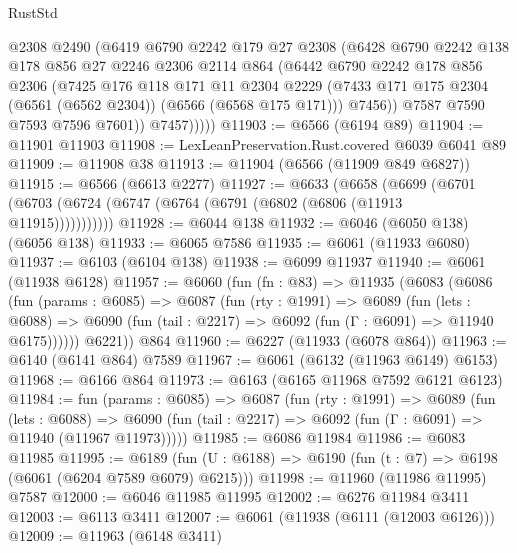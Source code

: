 \begin{lexlean}{RustStd}
\begin{coremodule}
{\begin{coremodule}
{{{{{{{{{{{{{{{{{{{{{{{{{{              @2308
              @2490
              (@6419
                @6790
                @2242
                @179
                @27
                @2308
                (@6428
                  @6790
                  @2242
                  @138
                  @178
                  @856
                  @27
                  @2246
                  @2306
                  @2114
                  @864
                  (@6442
                    @6790
                    @2242
                    @178
                    @856
                    @2306
                    (@7425
                      @176
                      @118
                      @171
                      @11
                      @2304
                      @2229
                      (@7433 @171 @175 @2304 (@6561 (@6562 @2304)) (@6566 (@6568 @175 @171)))
                      @7456))
                  @7587
                  @7590
                  @7593
                  @7596
                  @7601))
              @7457)))))
@11903 := @6566 (@6194 @89)
@11904 := @11901 @11903
@11908 := LexLeanPreservation.Rust.covered @6039 @6041 @89
@11909 := @11908 @38
@11913 := @11904 (@6566 (@11909 @849 @6827))
@11915 := @6566 (@6613 @2277)
@11927 := @6633
    (@6658 (@6699 (@6701 (@6703 (@6724 (@6747 (@6764 (@6791 (@6802 (@6806 (@11913 @11915)))))))))))
@11928 := @6044 @138
@11932 := @6046 (@6050 @138) (@6056 @138)
@11933 := @6065 @7586
@11935 := @6061 (@11933 @6080)
@11937 := @6103 (@6104 @138)
@11938 := @6099 @11937
@11940 := @6061 (@11938 @6128)
@11957 := @6060
    (fun (fn : @83) =>
    @11935
      (@6083
        (@6086
          (fun (params : @6085) =>
          @6087
            (fun (rty : @1991) =>
            @6089
              (fun (lets : @6088) =>
              @6090 (fun (tail : @2217) => @6092 (fun (Γ : @6091) => @11940 @6175))))))
        @6221))
    @864
@11960 := @6227 (@11933 (@6078 @864))
@11963 := @6140 (@6141 @864) @7589
@11967 := @6061 (@6132 (@11963 @6149) @6153)
@11968 := @6166 @864
@11973 := @6163 (@6165 @11968 @7592 @6121 @6123)
@11984 := fun (params : @6085) =>
  @6087
    (fun (rty : @1991) =>
    @6089
      (fun (lets : @6088) =>
      @6090 (fun (tail : @2217) => @6092 (fun (Γ : @6091) => @11940 (@11967 @11973)))))
@11985 := @6086 @11984
@11986 := @6083 @11985
@11995 := @6189 (fun (U : @6188) => @6190 (fun (t : @7) => @6198 (@6061 (@6204 @7589 @6079) @6215)))
@11998 := @11960 (@11986 @11995) @7587
@12000 := @6046 @11985 @11995
@12002 := @6276 @11984 @3411
@12003 := @6113 @3411
@12007 := @6061 (@11938 (@6111 (@12003 @6126)))
@12009 := @11963 (@6148 @3411)
}}}}}}}}}}}}}}}}}}}}}}}}}}
\end{coremodule}}
\end{coremodule}
\end{lexlean}
